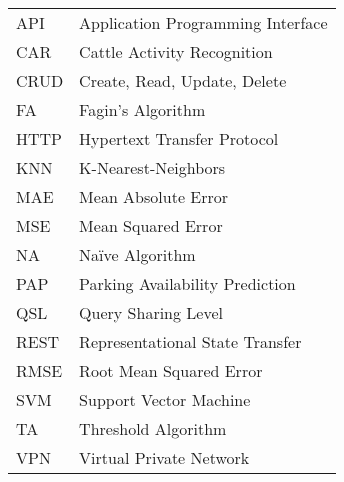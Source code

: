 \begin{longtable}[l]{ll}

API & Application Programming Interface \\
CAR & Cattle Activity Recognition \\
CRUD & Create, Read, Update, Delete \\
FA & Fagin's Algorithm \\
HTTP & Hypertext Transfer Protocol \\
KNN & K-Nearest-Neighbors \\
MAE & Mean Absolute Error \\
MSE & Mean Squared Error \\
NA & Naïve Algorithm \\
PAP & Parking Availability Prediction \\
QSL & Query Sharing Level \\
REST & Representational State Transfer \\
RMSE & Root Mean Squared Error \\
SVM & Support Vector Machine \\
TA & Threshold Algorithm \\
VPN & Virtual Private Network \\

\end{longtable}

